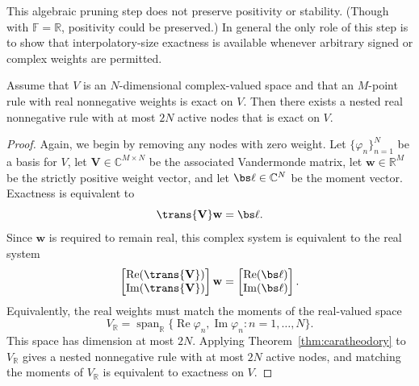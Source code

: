 \documentclass[10pt,dvipsnames]{amsart}
\begin{document}
This algebraic pruning step does not preserve positivity or stability. (Though with $\mathbb{F} = \mathbb{R}$, positivity could be preserved.)  In general the only role of this step is to show that interpolatory-size exactness is available whenever
arbitrary signed or complex weights are permitted.

\begin{corollary}
\label{cor:caratheodory_complex}
Assume that \(V\) is an \(N\)-dimensional complex-valued space and that an
\(M\)-point rule with real nonnegative weights is exact on \(V\).  Then there
exists a nested real nonnegative rule with at most \(2N\) active nodes that
is exact on \(V\).
\end{corollary}

\begin{proof}
Again, we begin by removing any nodes with zero weight.
Let \(\{\varphi_n\}_{n=1}^N\) be a basis for \(V\), let
\(\mathbf V\in\mathbb C^{M\times N}\) be the associated Vandermonde matrix,
let \(\mathbf w\in\mathbb R^M\) be the strictly positive weight vector, and let
\(\bs\ell\in\mathbb C^N\) be the moment vector.  Exactness is equivalent to
\[
    \trans{\mathbf V}\mathbf w=\bs\ell.
\]
Since \(\mathbf w\) is required to remain real, this complex system is
equivalent to the real system
\[
    \begin{bmatrix}
        \operatorname{Re}(\trans{\mathbf V}) \\
        \operatorname{Im}(\trans{\mathbf V})
    \end{bmatrix}
    \mathbf w
    =
    \begin{bmatrix}
        \operatorname{Re}(\bs\ell) \\
        \operatorname{Im}(\bs\ell)
    \end{bmatrix}.
\]
Equivalently, the real weights must match the moments of the real-valued
space
\[
    V_{\mathbb R}
    =
    \operatorname{span}_{\mathbb R}
    \{\operatorname{Re}\varphi_n,\operatorname{Im}\varphi_n:
      n=1,\ldots,N\}.
\]
This space has dimension at most \(2N\).  Applying
Theorem~\ref{thm:caratheodory} to \(V_{\mathbb R}\) gives a nested
nonnegative rule with at most \(2N\) active nodes, and matching the moments
of \(V_{\mathbb R}\) is equivalent to exactness on \(V\).
\end{proof}
\end{document}
